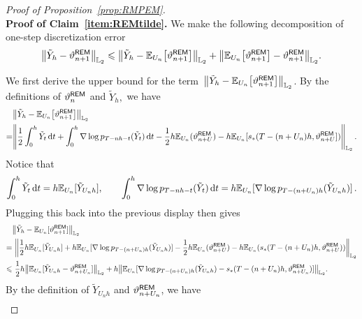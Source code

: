 \begin{proof}[Proof of Proposition~\ref{prop:RMPEM}]\\
\noindent \textbf{Proof of Claim~\ref{item:REMtilde}.} We make the following decomposition of one-step discretization error
\begin{align}
    \label{eq:REMdecom}
    \l|\tilde{Y}_{h}-\vartheta_{n+1}^{\sf REM}\r|_{\Ltwo}\leqslant\l|\tilde{Y}_h-\mathbb{E}_{U_n}\big[\vartheta_{n+1}^{\sf REM}\big]\r|_{\Ltwo}+\l|\mathbb{E}_{U_n}\big[\vartheta_{n+1}^{\sf REM}\big]-\vartheta_{n+1}^{\sf REM}\r|_{\Ltwo}.
\end{align}

We first derive the upper bound for the term~$\l|\tilde{Y}_h-\mathbb{E}_{U_n}\big[\vartheta_{n+1}^{\sf REM}\big]\r|_{\Ltwo}$. 
By the definitions of $\vartheta_n^{\sf REM}$ and $\tilde Y_h,$ we have
\begin{align*}
    &\l|\tilde{Y}_{h}-\mathbb{E}_{U_n}\big[\vartheta_{n+1}^{\sf REM}\big]\r|_{\Ltwo}\\
    =&\left\lVert \dfrac{1}{2}\int_0^h\tilde{Y}_t\rmd t+\int_0^h\nabla\log p_{T-nh-t}(\tilde{Y}_t)\rmd t-\dfrac{1}{2}h\mathbb{E}_{U_n}(\vartheta_{n+U}^{\sf REM})-h\mathbb{E}_{U_n}[s_*(T-(n+U_n)h,\vartheta_{n+U}^{\sf REM}])\right\rVert_{\Ltwo}\,.
\end{align*}
Notice that 
\begin{align*}
\int_0^h\tilde{Y}_t{\,\rm d} t = h\mathbb{E}_{U_n}[\tilde{Y}_{U_nh}],\qquad \int_0^h\nabla\log p_{T-nh-t}(\tilde{Y}_t){\,\rm d} t= h\mathbb{E}_{U_n}[\nabla\log p_{T-(n+U_n)h}(\tilde{Y}_{U_nh})]\,.
\end{align*}
Plugging this back into the previous display then gives
\begin{align*}
 &\l|\tilde{Y}_{h}-\mathbb{E}_{U_n}[\vartheta_{n+1}^{\sf REM}]\r|_{\Ltwo}\\
 =&\,\,\left\lVert \dfrac{1}{2}h\mathbb{E}_{U_n}[\tilde{Y}_{U_nh}]+h\mathbb{E}_{U_n}[\nabla\log p_{T-(n+U_n)h}(\tilde{Y}_{U_nh})]-\dfrac{1}{2}h\mathbb{E}_{U_n}(\vartheta_{n+U}^{\sf REM})-h\mathbb{E}_{U_n}(s_*(T-(n+U_n)h,\vartheta_{n+U}^{\sf REM}))\right\rVert_{\Ltwo}\\
    \leqslant&\,\,\dfrac{1}{2}h\left\lVert\mathbb{E}_{U_n}[\tilde{Y}_{U_nh}-\vartheta_{n+U_n}^{\sf REM}]\right\rVert_{\Ltwo}+h\left\lVert\mathbb{E}_{U_n}[\nabla\log p_{T-(n+U_n)h}(\tilde{Y}_{U_nh})-s_*(T-(n+U_n)h,\vartheta_{n+U_n}^{\sf REM})]\right\rVert_{\Ltwo}.
\end{align*}
By the definition of $\tilde{Y}_{U_nh}$ and $\vartheta_{n+U_n}^{\sf REM}$, we have
\begin{align*}

\end{align*}
\end{proof}
